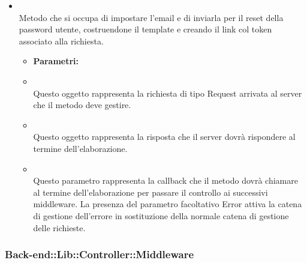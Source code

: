 \begin{itemize}
\item[] \textbf{} \\ Metodo che si occupa di impostare l'email e di inviarla per il reset della password utente, costruendone il template e creando il link col token associato alla richiesta.
\begin{itemize}\addtolength{\itemsep}{-0.5\baselineskip}
\item[] \textbf{Parametri:}
\item[]  \\ Questo oggetto rappresenta la richiesta di tipo Request arrivata al server che il metodo deve gestire.
\item[]  \\ Questo oggetto rappresenta la risposta che il server dovrà rispondere al termine dell'elaborazione.
\item[]  \\ Questo parametro rappresenta la callback che il metodo dovrà chiamare al termine dell'elaborazione per passare il controllo ai successivi middleware. La presenza del parametro facoltativo Error attiva la catena di gestione dell'errore in sostituzione della normale catena di gestione delle richieste.
\end{itemize}
\end{itemize}

	\subsubsection{Back-end::Lib::Controller::Middleware} 
